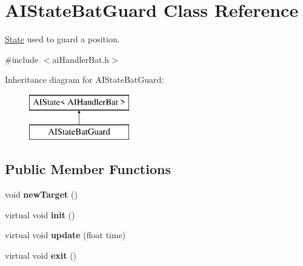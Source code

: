 \hypertarget{classAIStateBatGuard}{
\section{\-A\-I\-State\-Bat\-Guard \-Class \-Reference}
\label{d7/dd6/classAIStateBatGuard}
}


\hyperlink{classState}{\-State} used to guard a position.  




{\ttfamily \#include $<$ai\-Handler\-Bat.\-h$>$}

\-Inheritance diagram for \-A\-I\-State\-Bat\-Guard\-:\begin{figure}[H]
\begin{center}
\leavevmode
\includegraphics[height=2.000000cm]{d7/dd6/classAIStateBatGuard}
\end{center}
\end{figure}
\subsection*{\-Public \-Member \-Functions}
\begin{DoxyCompactItemize}
\item 
\hypertarget{classAIStateBatGuard_a4c01526d98ea186c819476e069ce0e89}{
void {\bfseries new\-Target} ()}
\label{d7/dd6/classAIStateBatGuard_a4c01526d98ea186c819476e069ce0e89}

\item 
\hypertarget{classAIStateBatGuard_a81a04c3d6e03842968b7a14d328645d5}{
virtual void {\bfseries init} ()}
\label{d7/dd6/classAIStateBatGuard_a81a04c3d6e03842968b7a14d328645d5}

\item 
\hypertarget{classAIStateBatGuard_a08fb55dcd58d9833ef25bda554e850ae}{
virtual void {\bfseries update} (float time)}
\label{d7/dd6/classAIStateBatGuard_a08fb55dcd58d9833ef25bda554e850ae}

\item 
\hypertarget{classAIStateBatGuard_aaa97aad8703848c4214d3731d73e0d31}{
virtual void {\bfseries exit} ()}
\label{d7/dd6/classAIStateBatGuard_aaa97aad8703848c4214d3731d73e0d31}

\end{DoxyCompactItemize}
